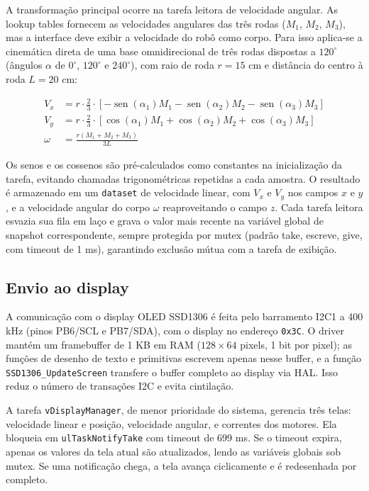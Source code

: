 \documentclass[a4paper,10pt]{article}
\begin{document}
A transformação principal ocorre na tarefa leitora de velocidade angular. As lookup tables fornecem as velocidades angulares das três rodas ($M_1$, $M_2$, $M_3$), mas a interface deve exibir a velocidade do robô como corpo. Para isso aplica-se a cinemática direta de uma base omnidirecional de três rodas dispostas a $120^{\circ}$ (ângulos $\alpha$ de $0^{\circ}$, $120^{\circ}$ e $240^{\circ}$), com raio de roda $r = 15$ cm e distância do centro à roda $L = 20$ cm:

\begin{align*}
V_x &= r \cdot \frac{2}{3} \cdot \left[ -\operatorname{sen}(\alpha_1) M_1 - \operatorname{sen}(\alpha_2) M_2 - \operatorname{sen}(\alpha_3) M_3 \right] \\
V_y &= r \cdot \frac{2}{3} \cdot \left[ \cos(\alpha_1) M_1 + \cos(\alpha_2) M_2 + \cos(\alpha_3) M_3 \right] \\
\omega &= \frac{r \left( M_1 + M_2 + M_3 \right)}{3L}
\end{align*}

Os senos e os cossenos são pré-calculados como constantes na inicialização da tarefa, evitando chamadas trigonométricas repetidas a cada amostra. O resultado é armazenado em um \texttt{dataset} de velocidade linear, com $V_x$ e $V_y$ nos campos $x$ e $y$, e a velocidade angular do corpo $\omega$ reaproveitando o campo $z$. Cada tarefa leitora esvazia sua fila em laço e grava o valor mais recente na variável global de snapshot correspondente, sempre protegida por mutex (padrão take, escreve, give, com timeout de 1 ms), garantindo exclusão mútua com a tarefa de exibição.

\subsection{Envio ao display}

A comunicação com o display OLED SSD1306 é feita pelo barramento I2C1 a 400 kHz (pinos PB6/SCL e PB7/SDA), com o display no endereço \texttt{0x3C}. O driver mantém um framebuffer de 1 KB em RAM ($128 \times 64$ pixels, 1 bit por pixel); as funções de desenho de texto e primitivas escrevem apenas nesse buffer, e a função \texttt{SSD1306\_UpdateScreen} transfere o buffer completo ao display via HAL. Isso reduz o número de transações I2C e evita cintilação.

A tarefa \texttt{vDisplayManager}, de menor prioridade do sistema, gerencia três telas: velocidade linear e posição, velocidade angular, e correntes dos motores. Ela bloqueia em \texttt{ulTaskNotifyTake} com timeout de 699 ms. Se o timeout expira, apenas os valores da tela atual são atualizados, lendo as variáveis globais sob mutex. Se uma notificação chega, a tela avança ciclicamente e é redesenhada por completo.
\end{document}
